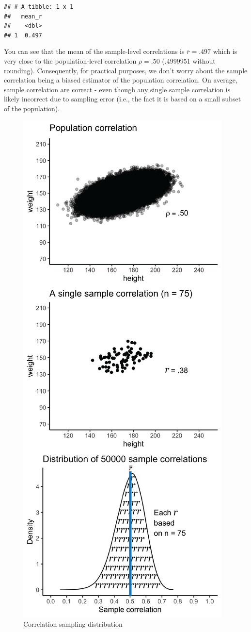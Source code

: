 \documentclass[
]{krantz}
\begin{document}
\begin{verbatim}
## # A tibble: 1 x 1
##   mean_r
##    <dbl>
## 1  0.497
\end{verbatim}

You can see that the mean of the sample-level correlations is \(\bar{r} = .497\) which is very close to the population-level correlation \(\rho = .50\) (.4999951 without rounding). Consequently, for practical purposes, we don't worry about the sample correlation being a biased estimator of the population correlation. On average, sample correlation are correct - even though any single sample correlation is likely incorrect due to sampling error (i.e., the fact it is based on a small subset of the population).

\begin{figure}
\includegraphics[width=0.7\linewidth,height=0.7\textheight]{ch_samples/images/r_sampling_dist_edit} \caption{Correlation sampling distribution}\label{fig:rdistplot}
\end{figure}
\end{document}
